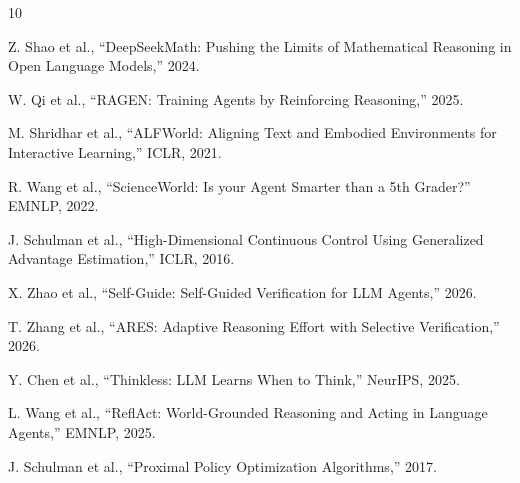 \documentclass{article}
\begin{document}

\begin{thebibliography}{10}

Z. Shao et al., ``DeepSeekMath: Pushing the Limits of Mathematical Reasoning in Open Language Models,'' 2024.

W. Qi et al., ``RAGEN: Training Agents by Reinforcing Reasoning,'' 2025.

M. Shridhar et al., ``ALFWorld: Aligning Text and Embodied Environments for Interactive Learning,'' ICLR, 2021.

R. Wang et al., ``ScienceWorld: Is your Agent Smarter than a 5th Grader?'' EMNLP, 2022.

J. Schulman et al., ``High-Dimensional Continuous Control Using Generalized Advantage Estimation,'' ICLR, 2016.

X. Zhao et al., ``Self-Guide: Self-Guided Verification for LLM Agents,'' 2026.

T. Zhang et al., ``ARES: Adaptive Reasoning Effort with Selective Verification,'' 2026.

Y. Chen et al., ``Thinkless: LLM Learns When to Think,'' NeurIPS, 2025.

L. Wang et al., ``ReflAct: World-Grounded Reasoning and Acting in Language Agents,'' EMNLP, 2025.

J. Schulman et al., ``Proximal Policy Optimization Algorithms,'' 2017.

\end{thebibliography}
\end{document}
